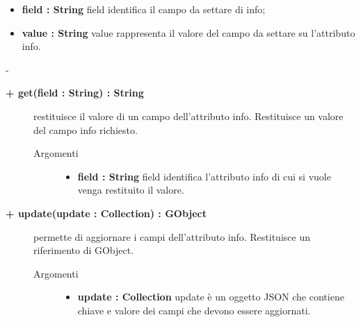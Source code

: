 \begin{description}
\begin{description}
\begin{description}
\begin{itemize}
					\item \textbf{field : String			} \hfill
					field identifica il campo da settare di info;
					\item \textbf{value : String			} \hfill
					value rappresenta il valore del campo da settare su l'attributo info.
				\end{itemize}
		\end{description}-

\end{description}

\begin{description}
		\item[\textbf{\color{blue}+ get(field : String) : String			}] \hfill
			restituisce il valore di un campo dell'attributo info. Restituisce un valore del campo info richiesto.
			
		\begin{description}
			\item[Argomenti] \hfill
				\begin{itemize}
				
					\item \textbf{field : String			} \hfill
					field identifica l'attributo info di cui si vuole venga restituito il valore.
				\end{itemize}
		\end{description}

\end{description}

\begin{description}
		\item[\textbf{\color{blue}+ update(update : Collection) : GObject			}] \hfill
			permette di aggiornare i campi dell'attributo info. Restituisce un riferimento di GObject.
			
		\begin{description}
			\item[Argomenti] \hfill
				\begin{itemize}
				
					\item \textbf{update : Collection			} \hfill
					update è un oggetto JSON che contiene chiave e valore dei campi che devono essere aggiornati. 
				\end{itemize}
		\end{description}

\end{description}


\end{description}

